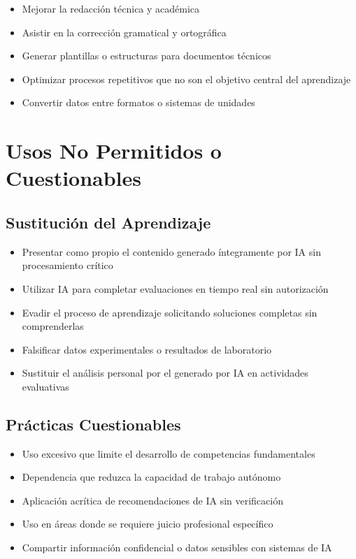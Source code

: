 \documentclass[11pt, letterpaper]{article}
\begin{document}
	\begin{recomendadocaja}
		\begin{itemize}
			\item Mejorar la redacción técnica y académica
			\item Asistir en la corrección gramatical y ortográfica
			\item Generar plantillas o estructuras para documentos técnicos
			\item Optimizar procesos repetitivos que no son el objetivo central del aprendizaje
			\item Convertir datos entre formatos o sistemas de unidades
		\end{itemize}
	\end{recomendadocaja}
	
	\section{Usos No Permitidos o Cuestionables}
	
	\subsection{Sustitución del Aprendizaje}
	
	\begin{nopermitidocaja}
		\begin{itemize}
			\item Presentar como propio el contenido generado íntegramente por IA sin procesamiento crítico
			\item Utilizar IA para completar evaluaciones en tiempo real sin autorización
			\item Evadir el proceso de aprendizaje solicitando soluciones completas sin comprenderlas
			\item Falsificar datos experimentales o resultados de laboratorio
			\item Sustituir el análisis personal por el generado por IA en actividades evaluativas
		\end{itemize}
	\end{nopermitidocaja}
	
	\subsection{Prácticas Cuestionables}
	
	\begin{precaucioncaja}
		\begin{itemize}
			\item Uso excesivo que limite el desarrollo de competencias fundamentales
			\item Dependencia que reduzca la capacidad de trabajo autónomo
			\item Aplicación acrítica de recomendaciones de IA sin verificación
			\item Uso en áreas donde se requiere juicio profesional específico
			\item Compartir información confidencial o datos sensibles con sistemas de IA
		\end{itemize}
	\end{precaucioncaja}
	
\end{document}
